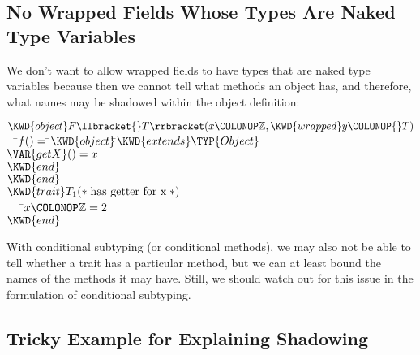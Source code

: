 \subsection{No Wrapped Fields Whose Types Are Naked Type Variables}

We don't want to allow wrapped fields to have types
that are naked type variables
because then we cannot tell what methods an object has,
and therefore, what names may be shadowed within the object definition:
%
\begin{Fortress}
\(\KWD{object} F\llbracket{}T\rrbracket(x\COLONOP\mathbb{Z}, \KWD{wrapped} y\COLONOP{}T)\)\\
{\tt~~}\pushtabs\=\+\(  f()  = \null\)\pushtabs\=\+\(\KWD{object} \null\)\pushtabs\=\+\(\KWD{extends} \TYP{Object}\)\\
\(                \VAR{getX}() = x\)\-\\\poptabs
\(         \KWD{end}\)\-\-\\\poptabs\poptabs
\(\KWD{end}\)\\[4pt]
\(\KWD{trait} T_{1} \mathtt{(*}\;\hbox{\rm  has getter for x \unskip}\;\mathtt{*)}\)\\
{\tt~~~}\pushtabs\=\+\(   x\COLONOP\mathbb{Z} = 2\)\-\\\poptabs
\(\KWD{end}\)
\end{Fortress}
With conditional subtyping (or conditional methods),
we may also not be able to tell
whether a trait has a particular method,
but we can at least bound the names of the methods it may have.
Still, we should watch out for this issue
in the formulation of conditional subtyping.


\subsection{Tricky Example for Explaining Shadowing}

